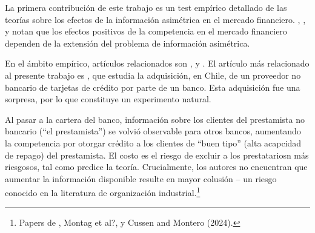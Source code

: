 \documentclass[11pt]{article}
\theoremstyle{plain}
\theoremstyle{plain}
\begin{document}

\vspace{2cm} 


La primera contribución de este trabajo es un test empírico detallado de las teorías sobre los efectos de la información asimétrica en el mercado financiero. \textcite{sharpe_asymmetric_1990}, \textcite{petersen_effect_1995}, \textcite{dellariccia_adverse_1999} y \textcite{dellariccia_information_2004} notan que los efectos positivos de la competencia en el mercado financiero dependen de la extensión del problema de información asimétrica.

En el ámbito empírico, artículos relacionados son \textcite{petersen_benefits_1994,petersen_effect_1995}, \textcite{liberman_equilibrium_2018} y \textcite{foley_effects_2022}. El artículo más relacionado al presente trabajo es \textcite{foley_effects_2022}, que estudia la adquisición, en Chile, de un proveedor no bancario de tarjetas de crédito por parte de un banco. Esta adquisición fue una sorpresa, por lo que constituye un experimento natural. 

Al pasar a la cartera del banco, información sobre los clientes del prestamista no bancario (``el prestamista'') se volvió observable para otros bancos, aumentando la competencia por otorgar crédito a los clientes de ``buen tipo'' (alta acapcidad de repago) del prestamista. El costo es el riesgo de excluir a los prestatariosn más riesgosos, tal como predice la teoría. Crucialmente, los autores no encuentran que aumentar la información disponible resulte en mayor colusión -- un riesgo conocido en la literatura de organización industrial.\footnote{Papers de \textcite{green_noncooperative_1984}, Montag et al?, y Cussen and Montero (2024).}
\end{document}
